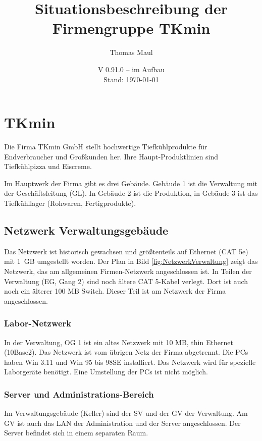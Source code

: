 \documentclass[a4paper,10pt]{scrreprt}
\begin{document}
  \title{Situationsbeschreibung der Firmengruppe TKmin}
\author{Thomas Maul}
\date{V 0.91.0 -- im Aufbau\\ Stand: \today}%
\maketitle
\tableofcontents
\chapter{TKmin}
Die Firma TKmin GmbH stellt hochwertige Tiefkühlprodukte für Endverbraucher und Großkunden her. Ihre Haupt-Produktlinien sind Tiefkühlpizza und Eiscreme.

Im Hauptwerk der Firma gibt es drei Gebäude. Gebäude 1 ist die Verwaltung mit der Geschäftsleitung (GL). In Gebäude 2 ist die Produktion, in Gebäude 3 ist das Tiefkühllager (Rohwaren, Fertigprodukte).

\section{Netzwerk Verwaltungsgebäude}
Das Netzwerk ist historisch gewachsen und größtenteils auf Ethernet (CAT 5e) mit 1\, GB umgestellt worden. Der Plan in Bild \ref{fig:NetzwerkVerwaltung} zeigt das Netzwerk, das am allgemeinen Firmen-Netzwerk angeschlossen ist. In Teilen der Verwaltung (EG, Gang 2) sind noch ältere CAT 5-Kabel verlegt. Dort ist auch noch ein älterer 100 MB Switch. Dieser Teil ist am Netzwerk der Firma angeschlossen.

\subsection{Labor-Netzwerk}
In der Verwaltung, OG 1 ist ein altes Netzwerk mit 10 MB, thin Ethernet (10Base2). Das Netzwerk ist vom übrigen Netz der Firma abgetrennt. Die PCs haben Win 3.11 und Win 95 bis 98SE installiert. Das Netzwerk wird für spezielle Laborgeräte benötigt. Eine Umstellung der PCs ist nicht möglich.

\subsection{Server und Administrations-Bereich}
Im Verwaltungsgebäude (Keller) sind der SV und der GV der Verwaltung. Am GV ist auch das LAN der Administration und der Server angeschlossen. Der Server befindet sich in einem separaten Raum.
\end{document}

